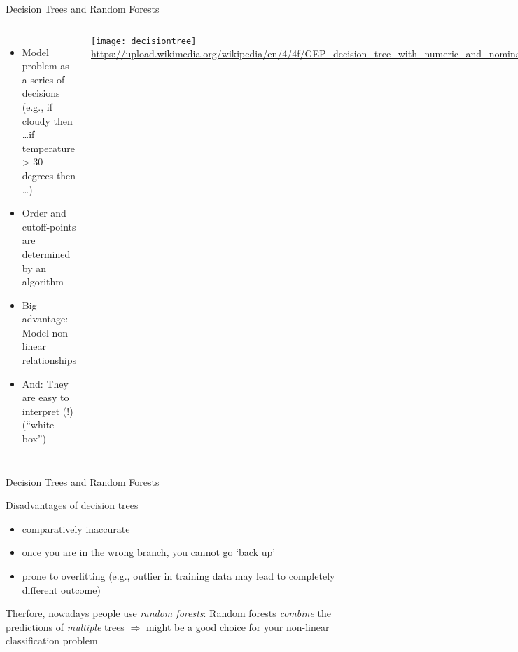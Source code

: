 \begin{frame}{Decision Trees and Random Forests}
  \begin{columns}
    \begin{itemize}[<+->]
    \item Model problem as a series of decisions (e.g., if cloudy then \ldots if temperature > 30 degrees then \ldots)
    \item Order and cutoff-points are determined by an algorithm
    \item Big advantage: Model non-linear relationships
    \item And: They are easy to interpret (!) (``white box'')
    \end{itemize}
		\texttt{[image: decisiontree]}
		\tiny{\url{https://upload.wikimedia.org/wikipedia/en/4/4f/GEP\_decision\_tree\_with\_numeric\_and\_nominal\_attributes.png}}
	\end{columns}
\end{frame}
\begin{frame}{Decision Trees and Random Forests}
  \begin{block}{Disadvantages of decision trees}
    \begin{itemize}
    \item comparatively inaccurate
    \item once you are in the wrong branch, you cannot go `back up'
    \item prone to overfitting (e.g., outlier in training data may lead to completely different outcome)
    \end{itemize}
  \end{block}
  \pause
  Therfore, nowadays people use \emph{random forests}: Random forests \emph{combine} the predictions of \emph{multiple} trees
  $\Rightarrow$ might be a good choice for your non-linear classification problem
\end{frame}
